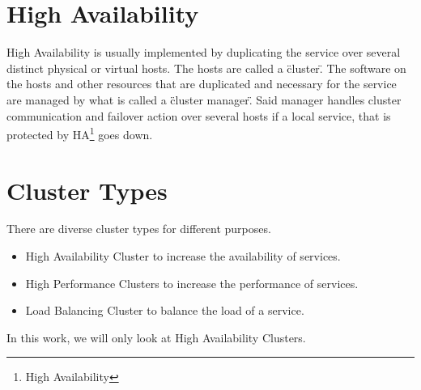 \section{High Availability}


High Availability is usually implemented by duplicating the service over several distinct physical or
virtual hosts. The hosts are called a \"cluster\". The software on the hosts and other resources
that are duplicated and necessary for the service are managed by what is called a \"cluster manager\".
Said manager handles cluster communication and failover action over several hosts if a local service,
that is protected by HA\footnote{High Availability} goes down.

\section{Cluster Types}

There are diverse cluster types for different purposes.
\begin{itemize}
\item High Availability Cluster to increase the availability of services.
\item High Performance Clusters to increase the performance of services.
\item Load Balancing Cluster to balance the load of a service.
\end{itemize}

In this work, we will only look at High Availability Clusters.
